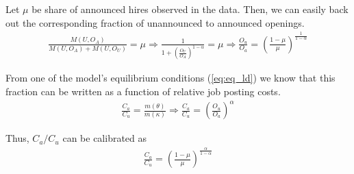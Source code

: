 \documentclass[11pt,article]{memoir}
\begin{document}
Let $\mu$ be share of announced hires observed in the data. Then, we can easily back out the corresponding fraction of unannounced to announced openings.
\begin{align}
\frac{M(U, O_A)}{M(U, O_A)+M(U, O_U)}=\mu \Rightarrow \frac{1}{1+\left(\frac{O_U}{O_A}\right)^{1-\alpha}}=\mu \Rightarrow \frac{O_u}{O_a}=\left( \frac{1-\mu}{\mu}  \right)^{\frac{1}{1-\alpha}}
\end{align}

From one of the model's equilibrium conditions (\ref{eq:eq_ld}) we know that this fraction can be written as a function of relative job posting costs.
\begin{align}
 \frac{C_a}{C_u}=\frac{m\left( \theta \right)}{m\left( \kappa \right)} \Rightarrow \frac{C_a}{C_u}=\left(\frac{O_u}{O_a} \right)^\alpha
\end{align}

Thus, $C_a/C_u$ can be calibrated as 
\begin{align}
\frac{C_a}{C_u}=\left( \frac{1-\mu}{\mu}  \right)^{\frac{\alpha}{1-\alpha}}
\end{align}


%
\end{document}
